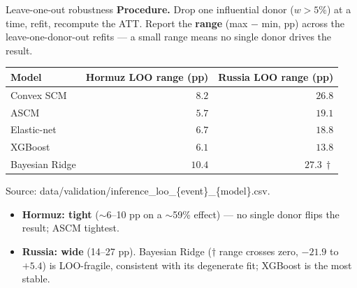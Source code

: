 \documentclass[aspectratio=169,11pt]{beamer}
\newcommand{\smalltext}[1]{{\footnotesize\textcolor{muted}{#1}}}
\newcommand{\hd}[1]{\textbf{#1}}
\begin{document}
\begin{frame}{Leave-one-out robustness}
  \footnotesize
  \hd{Procedure.} Drop one influential donor ($w > 5\%$) at a time, refit, recompute the ATT. Report the
  \hd{range} (max $-$ min, pp) across the leave-one-donor-out refits --- a small range means no single donor
  drives the result.

  \vspace{0.5em}
  \begin{center}
  \begin{tabular}{@{}l r r@{}}
    \toprule
    \hd{Model}     & \hd{Hormuz LOO range (pp)} & \hd{Russia LOO range (pp)} \\
    \midrule
    Convex SCM     & $8.2$           & $26.8$          \\
    ASCM           & $\mathbf{5.7}$  & $19.1$          \\
    Elastic-net    & $6.7$           & $18.8$          \\
    XGBoost        & $6.1$           & $\mathbf{13.8}$ \\
    Bayesian Ridge & $10.4$          & $27.3\,\dagger$ \\
    \bottomrule
  \end{tabular}
  \end{center}
  \smalltext{Source: data/validation/inference\_loo\_\{event\}\_\{model\}.csv.}

  \vspace{0.4em}
  \begin{itemize}\setlength\itemsep{0.1em}
    \item \hd{Hormuz: tight} ($\sim$6--10 pp on a $\sim$59\% effect) --- no single donor flips the result; ASCM tightest.
    \item \hd{Russia: wide} (14--27 pp). Bayesian Ridge ($\dagger$ range crosses zero, $-21.9$ to $+5.4$) is
      LOO-fragile, consistent with its degenerate fit; XGBoost is the most stable.
  \end{itemize}
\end{frame}
\end{document}
